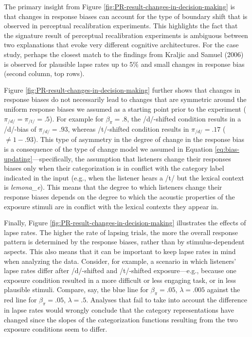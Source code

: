 \documentclass[
  11pt,
  english,
  man,floatsintext]{apa6}
\begin{document}
The primary insight from Figure \ref{fig:PR-result-changes-in-decision-making} is that changes in response biases can account for the type of boundary shift that is observed in perceptual recalibration experiments. This highlights the fact that the signature result of perceptual recalibration experiments is ambiguous between two explanations that evoke very different cognitive architectures. For the case study, perhaps the closest match to the findings from Kraljic and Samuel (2006) is observed for plausible lapse rates up to 5\% and small changes in response bias (second column, top rows).

Figure \ref{fig:PR-result-changes-in-decision-making} further shows that changes in response biases do not necessarily lead to changes that are symmetric around the uniform response biases we assumed as a starting point prior to the experiment (\(\pi_{/d/}=\pi_{/t/}=.5\)). For example for \(\beta_{\pi} = .8\), the /d/-shifted condition results in a /d/-bias of \(\pi_{/d/}=.93\), whereas /t/-shifted condition results in \(\pi_{/d/}=.17\) (\(\neq 1 - .93\)). This type of asymmetry in the degree of change in the response bias is a consequence of the type of change model we assumed in Equation \eqref{eq:bias-updating}---specifically, the assumption that listeners change their responses biases only when their categorization is in conflict with the category label indicated in the input (e.g., when the listener hears a /t/ but the lexical context is \emph{lemona\_e}). This means that the degree to which listeners change their response biases depends on the degree to which the acoustic properties of the exposure stimuli are in conflict with the lexical contexts they appear in.

Finally, Figure \ref{fig:PR-result-changes-in-decision-making} illustrates the effects of lapse rates. The higher the rate of lapsing trials, the more the overall response pattern is determined by the response biases, rather than by stimulus-dependent aspects. This also means that it can be important to keep lapse rates in mind when analyzing the data. Consider, for example, a scenario in which listeners' lapse rates differ after /d/-shifted and /t/-shifted exposure---e.g., because one exposure condition resulted in a more difficult or less engaging task, or in less plausible stimuli. Compare, say, the blue line for \(\beta_{\pi} = .05\), \(\lambda = .005\) against the red line for \(\beta_{\pi} = .05\), \(\lambda = .5\). Analyses that fail to take into account the difference in lapse rates would wrongly conclude that the category representations have changed since the slopes of the categorization functions resulting from the two exposure conditions seem to differ.
\end{document}
